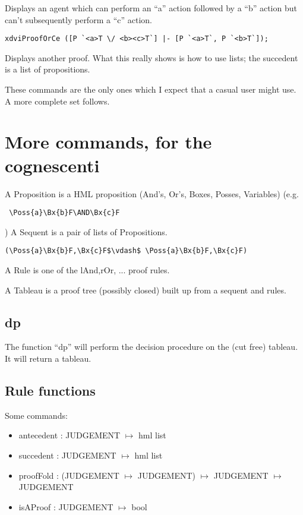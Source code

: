 \documentclass[12pt]{article}
\begin{document}
Displays an agent which can perform an ``a'' action followed by a ``b'' action
but can't subsequently perform a ``c'' action.

\begin{verbatim}
xdviProofOrCe ([P `<a>T \/ <b><c>T`] |- [P `<a>T`, P `<b>T`]);
\end{verbatim}

Displays another proof.  What this really shows is how to use
lists; the succedent is a list of propositions.

These commands are the only ones which I expect that a casual user
might use.  A more complete set follows.

\section{More commands, for the cognescenti}
A Proposition is a HML proposition (And's, Or's, Boxes, Posses, Variables)
(e.g. \begin{verbatim} \Poss{a}\Bx{b}F\AND\Bx{c}F \end{verbatim})
A Sequent is a pair of lists of Propositions.

\begin{verbatim}
(\Poss{a}\Bx{b}F,\Bx{c}F$\vdash$ \Poss{a}\Bx{b}F,\Bx{c}F)
\end{verbatim}

A Rule is one of the lAnd,rOr, ... proof rules.

A Tableau is a proof tree (possibly closed) built 
up from a sequent and rules.

\subsection{dp}
The function ``dp'' will perform the decision procedure
on the (cut free) tableau.  It will return a tableau.

\subsection{Rule functions}
Some commands:
\begin{itemize}
\item antecedent : JUDGEMENT $\mapsto$ hml list
\item succedent : JUDGEMENT $\mapsto$ hml list
\item proofFold : (JUDGEMENT $\mapsto$ JUDGEMENT) $\mapsto$ JUDGEMENT $\mapsto$ JUDGEMENT
\item isAProof : JUDGEMENT $\mapsto$ bool
\end{itemize}
\end{document}
